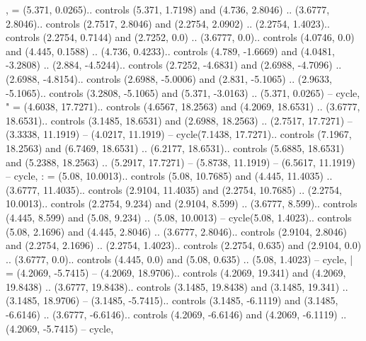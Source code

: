 {,} = {(5.371, 0.0265).. controls (5.371, 1.7198) and (4.736, 2.8046) .. (3.6777, 2.8046).. controls (2.7517, 2.8046) and (2.2754, 2.0902) .. (2.2754, 1.4023).. controls (2.2754, 0.7144) and (2.7252, 0.0) .. (3.6777, 0.0).. controls (4.0746, 0.0) and (4.445, 0.1588) .. (4.736, 0.4233).. controls (4.789, -1.6669) and (4.0481, -3.2808) .. (2.884, -4.5244).. controls (2.7252, -4.6831) and (2.6988, -4.7096) .. (2.6988, -4.8154).. controls (2.6988, -5.0006) and (2.831, -5.1065) .. (2.9633, -5.1065).. controls (3.2808, -5.1065) and (5.371, -3.0163) .. (5.371, 0.0265) -- cycle},
{"} = {(4.6038, 17.7271).. controls (4.6567, 18.2563) and (4.2069, 18.6531) .. (3.6777, 18.6531).. controls (3.1485, 18.6531) and (2.6988, 18.2563) .. (2.7517, 17.7271) -- (3.3338, 11.1919) -- (4.0217, 11.1919) -- cycle(7.1438, 17.7271).. controls (7.1967, 18.2563) and (6.7469, 18.6531) .. (6.2177, 18.6531).. controls (5.6885, 18.6531) and (5.2388, 18.2563) .. (5.2917, 17.7271) -- (5.8738, 11.1919) -- (6.5617, 11.1919) -- cycle},
{:} = {(5.08, 10.0013).. controls (5.08, 10.7685) and (4.445, 11.4035) .. (3.6777, 11.4035).. controls (2.9104, 11.4035) and (2.2754, 10.7685) .. (2.2754, 10.0013).. controls (2.2754, 9.234) and (2.9104, 8.599) .. (3.6777, 8.599).. controls (4.445, 8.599) and (5.08, 9.234) .. (5.08, 10.0013) -- cycle(5.08, 1.4023).. controls (5.08, 2.1696) and (4.445, 2.8046) .. (3.6777, 2.8046).. controls (2.9104, 2.8046) and (2.2754, 2.1696) .. (2.2754, 1.4023).. controls (2.2754, 0.635) and (2.9104, 0.0) .. (3.6777, 0.0).. controls (4.445, 0.0) and (5.08, 0.635) .. (5.08, 1.4023) -- cycle},
{|} = {(4.2069, -5.7415) -- (4.2069, 18.9706).. controls (4.2069, 19.341) and (4.2069, 19.8438) .. (3.6777, 19.8438).. controls (3.1485, 19.8438) and (3.1485, 19.341) .. (3.1485, 18.9706) -- (3.1485, -5.7415).. controls (3.1485, -6.1119) and (3.1485, -6.6146) .. (3.6777, -6.6146).. controls (4.2069, -6.6146) and (4.2069, -6.1119) .. (4.2069, -5.7415) -- cycle},
